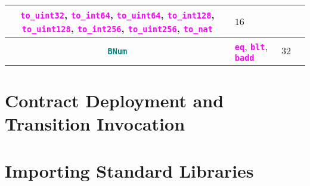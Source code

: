 \documentclass[9pt]{article}
\begin{document}
\begin{table}[!hbt]
\begin{tabular}{|c|p{4.1cm}|p{4cm}|p{5cm}|}
		 \textbf{\texttt{\textcolor{magenta}{to\_uint32}}},
		 \textbf{\texttt{\textcolor{magenta}{to\_int64}}},
		 \textbf{\texttt{\textcolor{magenta}{to\_uint64}}},
		 \textbf{\texttt{\textcolor{magenta}{to\_int128}}},
		 \textbf{\texttt{\textcolor{magenta}{to\_uint128}}},
		 \textbf{\texttt{\textcolor{magenta}{to\_int256}}},
		 \textbf{\texttt{\textcolor{magenta}{to\_uint256}}},
		 \textbf{\texttt{\textcolor{magenta}{to\_nat}}}
		 & $ 16 $  & \\ \hline \hline
		\textbf{\texttt{\textcolor{teal}{BNum}}} &
		\textbf{\texttt{\textcolor{magenta}{eq}}},
		\textbf{\texttt{\textcolor{magenta}{blt}}},
		\textbf{\texttt{\textcolor{magenta}{badd}}} & $32$  & \\ \hline 
	\end{tabular}
\end{table}



\section{Contract Deployment and Transition Invocation}

\section{Importing Standard Libraries}
\end{document}
